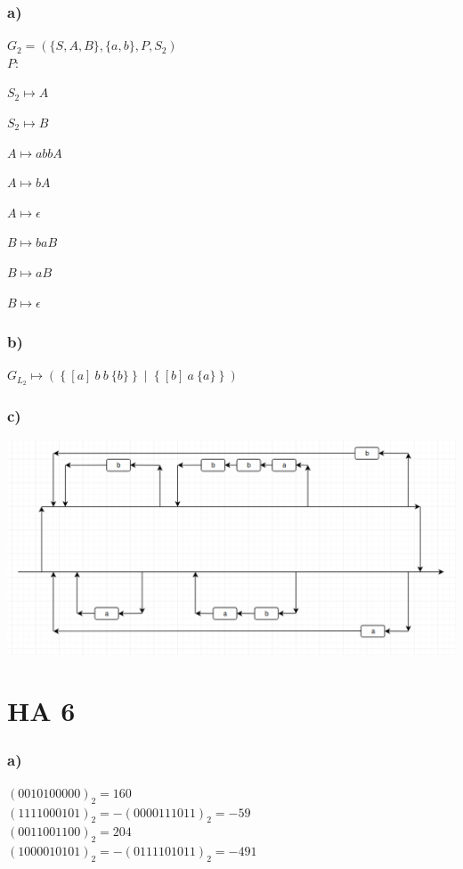 \documentclass[a4paper]{article}
\begin{document}
\subsubsection*{ a) }
	
	$G_2 = (\{S,A,B\},\{a,b\},P,S_2)$ \\
	$P:$

	$ S_2 \mapsto A $

	$ S_2 \mapsto B $

	$ A   \mapsto abbA $

	$ A   \mapsto bA $

	$ A   \mapsto \epsilon $

	$ B   \mapsto baB $

	$ B   \mapsto aB $

	$ B   \mapsto \epsilon $

\subsubsection*{ b) }
	$G_{L_2} \mapsto (~\{~[a]~b~b~\{b\}~\} ~\mid~ \{~[b]~a~\{a\}~\}~) $ \\

\subsubsection*{ c) }
	\includegraphics*[width=\linewidth]{Uebung_01_Chart.png}

\section*{ HA 6 }

\subsubsection*{ a) }
	$ (0010100000)_2 = 160 $ \\
	$ (1111000101)_2 = -(0000111011)_2 = -59 $ \\
	$ (0011001100)_2 = 204 $ \\
	$ (1000010101)_2 = -(0111101011)_2 = -491 $ \\
\end{document}
